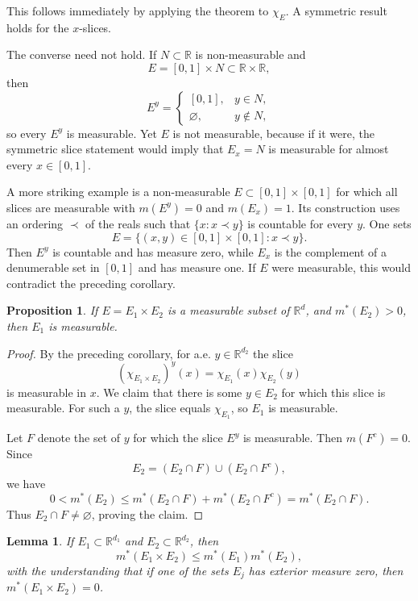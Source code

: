 \documentclass[11pt,openany]{book}
\newtheorem{lemma}[theorem]{Lemma}
\newtheorem{proposition}[theorem]{Proposition}
\begin{document}
This follows immediately by applying the theorem to $\chi_E$. A symmetric result holds for the $x$-slices.

The converse need not hold. If $N\subset\mathbb{R}$ is non-measurable and
\[
E=[0,1]\times N\subset\mathbb{R}\times\mathbb{R},
\]
then
\[
E^y=
\begin{cases}
[0,1],&y\in N,\\
\varnothing,&y\notin N,
\end{cases}
\]
so every $E^y$ is measurable. Yet $E$ is not measurable, because if it were, the symmetric slice statement would imply that $E_x=N$ is measurable for almost every $x\in[0,1]$.

A more striking example is a non-measurable $E\subset[0,1]\times[0,1]$ for which all slices are measurable with $m(E^y)=0$ and $m(E_x)=1$. Its construction uses an ordering $\prec$ of the reals such that $\{x:x\prec y\}$ is countable for every $y$. One sets
\[
E=\{(x,y)\in[0,1]\times[0,1]:x\prec y\}.
\]
Then $E^y$ is countable and has measure zero, while $E_x$ is the complement of a denumerable set in $[0,1]$ and has measure one. If $E$ were measurable, this would contradict the preceding corollary.

\begin{proposition}
If $E=E_1\times E_2$ is a measurable subset of $\mathbb{R}^d$, and $m^*(E_2)>0$, then $E_1$ is measurable.
\end{proposition}

\begin{proof}
By the preceding corollary, for a.e. $y\in\mathbb{R}^{d_2}$ the slice
\[
(\chi_{E_1\times E_2})^y(x)=\chi_{E_1}(x)\chi_{E_2}(y)
\]
is measurable in $x$. We claim that there is some $y\in E_2$ for which this slice is measurable. For such a $y$, the slice equals $\chi_{E_1}$, so $E_1$ is measurable.

Let $F$ denote the set of $y$ for which the slice $E^y$ is measurable. Then $m(F^c)=0$. Since
\[
E_2=(E_2\cap F)\cup(E_2\cap F^c),
\]
we have
\[
0<m^*(E_2)
\leq m^*(E_2\cap F)+m^*(E_2\cap F^c)
=m^*(E_2\cap F).
\]
Thus $E_2\cap F\neq\varnothing$, proving the claim.
\end{proof}

\begin{lemma}
If $E_1\subset\mathbb{R}^{d_1}$ and $E_2\subset\mathbb{R}^{d_2}$, then
\[
m^*(E_1\times E_2)\leq m^*(E_1)m^*(E_2),
\]
with the understanding that if one of the sets $E_j$ has exterior measure zero, then $m^*(E_1\times E_2)=0$.
\end{lemma}
\end{document}
